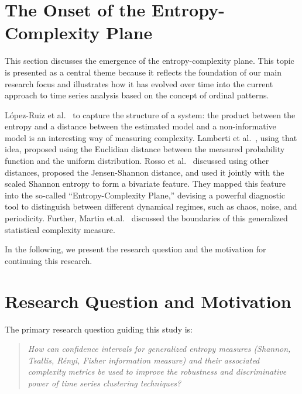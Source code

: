

\section{The Onset of the Entropy-Complexity Plane}\label{Sec:Onset}


This section discusses the emergence of the entropy-complexity plane. This topic is presented as a central theme because it reflects the foundation of our main research focus and illustrates how it has evolved over time into the current approach to time series analysis based on the concept of ordinal patterns. 

López-Ruiz et al.~\cite{lopez1995statistical} to capture the structure of a system:
the product between the entropy and a distance between the estimated model and a non-informative model is an interesting way of measuring complexity.
Lamberti et al.~\cite{lamberti2004intensive}, using that idea, proposed using the Euclidian distance between the measured probability function and the uniform distribution.
Rosso et al.~\cite{EEGAnalysisUsingWaveletBasedInformationTools} discussed using other distances, proposed the Jensen-Shannon distance, and used it jointly with the scaled Shannon entropy to form a bivariate feature.
They mapped this feature into the so-called ``Entropy-Complexity Plane,'' devising  a powerful diagnostic tool to distinguish between different dynamical regimes, such as chaos, noise, and periodicity.
Further, Martin et.al.~\cite{Martin2006} discussed the boundaries of this generalized statistical complexity measure. 

In the following, we present the research question and the motivation for continuing this research. 

\section{Research Question and Motivation}\label{Sec:ResearchQuestion}

The primary research question guiding this study is:
\begin{quote}
	\textit{How can confidence intervals for generalized entropy measures (Shannon, Tsallis, Rényi, Fisher information measure) and their associated complexity metrics be used to improve the robustness and discriminative power of time series clustering techniques?}
\end{quote}

